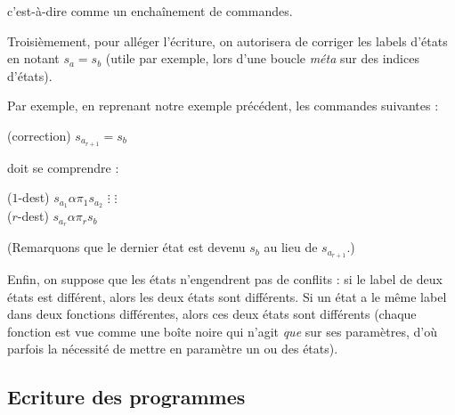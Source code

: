 \documentclass{report}
\begin{document}
\begin{appendices}
					\espace
					
					c'est-à-dire comme un enchaînement de commandes. 
					
					
					Troisièmement, pour alléger l'écriture, on autorisera de corriger les labels d'états en notant $s_a = s_b$ (utile par exemple, lors d'une boucle \emph{méta} sur des indices d'états).
					
					Par exemple, en reprenant notre exemple précédent, les commandes suivantes :
					
					\espace
					
					\begin{algorithm}[H]
						(correction)		$s_{a_{r+1}} = s_b$
					\end{algorithm}
					
					\espace
					
					doit se comprendre :
					
					\espace
					
					\begin{algorithm}[H]
						($1$-dest) 	$s_{a_1} \alpha \pi_1 s_{a_{2}}$\;
						$\vdots$		\hspace{1cm} $\vdots$ \\
						($r$-dest) 	$s_{a_r} \alpha \pi_r s_{b}$\;
					\end{algorithm}
					
					\espace
					
					(Remarquons que le dernier état est devenu $s_b$ au lieu de $s_{a_{r+1}}$.)
					
					
					\espace
					
					
					Enfin, on suppose que les états n'engendrent pas de conflits : si le label de deux états est différent, alors les deux états sont différents. Si un état a le même label dans deux fonctions différentes, alors ces deux états sont différents (chaque fonction est vue comme une boîte noire qui n'agit \emph{que} sur ses paramètres, d'où parfois la nécessité de mettre en paramètre un ou des états).
				
				
				\subsection{Ecriture des programmes}
				\label{subsec:ecriture_programmes}
				
				
				\begin{algorithm}[H]
					\label{prog:A_RAM_fn_COPY}
					

\end{algorithm}
\end{appendices}
\end{document}
